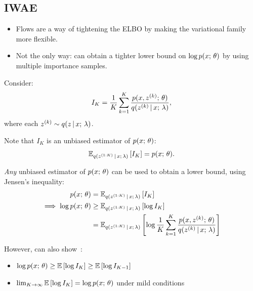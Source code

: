 \subsection{IWAE}
\begin{frame}
\begin{itemize}
    \item Flows are a way of tightening the ELBO by making the variational family more flexible. 
    \item Not the only way: can obtain a tighter lower bound on $\log p(x ; \, \theta)$ by using multiple importance samples.
\end{itemize}

    \air
    \air

    Consider:
    \begin{align*}
        I_K = \frac{1}{K} \sum_{k=1}^K \frac{p(x, z^{(k)} ; \, \theta)}{q(z^{(k)} \,|\, x ; \, \lambda)},
    \end{align*}
    where each $z^{(k)} \sim q(z \,|\, x ; \, \lambda)$.
    
    \air
    \air
    Note that $I_K$ is an unbiased estimator of $p(x ; \, \theta)$:
    \begin{align*}
        \mathbb{E}_{q(z^{(1:K)} \,|\, x ; \, \lambda)} \left[I_K \right] = p(x ; \, \theta).
    \end{align*}

\air
% 
\end{frame}


\begin{frame}
    \textit{Any} unbiased estimator of $p(x ; \, \theta)$ can be used to obtain a lower bound, using Jensen's inequality:
    \begin{align*}
        p(x ; \, \theta) &= \mathbb{E}_{q(z^{(1:K)} \,|\, x ; \, \lambda)} \left[ I_K \right] \\
        \implies \log p(x ; \, \theta) &\geq \mathbb{E}_{q(z^{(1:K)} \,|\, x ; \, \lambda)} \left[ \log I_K \right] \\
        &= \mathbb{E}_{q(z^{(1:K)} \,|\, x ; \, \lambda)} \left[ \log \frac{1}{K} \sum_{k=1}^K \frac{p(x, z^{(k)} ; \, \theta)}{q(z^{(k)} \,|\, x ; \, \lambda)} \right]
    \end{align*}

However, can also show~\citep{Burda2015}:
\begin{itemize}
    \item $\log p(x ; \, \theta) \geq \mathbb{E} \left[ \log I_K \right] \geq \mathbb{E} \left[ \log I_{K-1} \right]$
    \item $\lim_{K \rightarrow \infty} \mathbb{E} \left[ \log I_K \right] = \log p(x ; \, \theta)$ under mild conditions
\end{itemize}
\end{frame}

